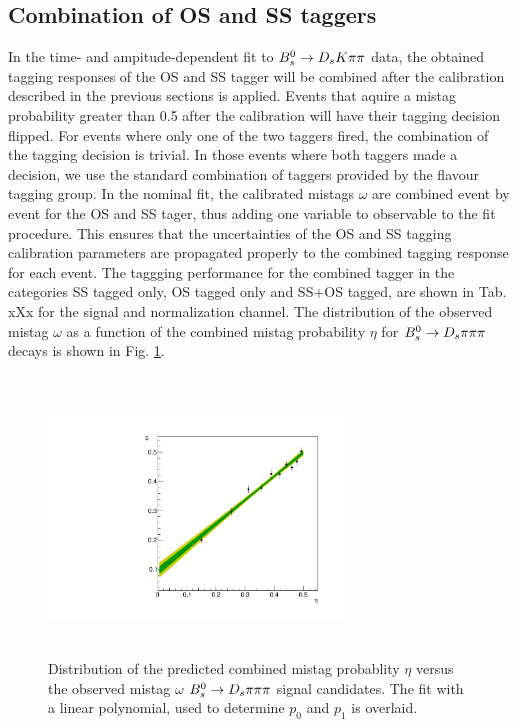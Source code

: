 \subsection{Combination of OS and SS taggers}
\label{subsec: TaggingCombination}

In the time- and ampitude-dependent fit to ${{B}^0_{s}}\rightarrow{\ensuremath{{D}_{s}}}{\ensuremath{K}}{\ensuremath{\pi}}{\ensuremath{\pi}}$ data, the obtained tagging responses of the OS and SS tagger will be combined after the calibration described in the previous sections is applied.
Events that aquire a mistag probability greater than 0.5 after the calibration will have their tagging decision flipped. For events where only one of the two taggers fired, the combination of the tagging decision is trivial.
In those events where both taggers made a decision, we use the standard combination of taggers \cite{LHCb-PAPER-2011-027} provided by the flavour tagging group. 
In the nominal fit, the calibrated mistags $\omega$ are combined event by event for the OS and SS tager, thus adding one variable to observable to the fit procedure. 
This ensures that the uncertainties of the OS and SS tagging calibration parameters are propagated properly to the combined tagging response for each event. \newline
The taggging performance for the combined tagger in the categories SS tagged only, OS tagged only and SS+OS tagged, are shown in Tab. xXx for the signal and normalization channel.
The distribution of the observed mistag $\omega$ as a function of the combined mistag probability $\eta$ for ${{B}^0_{s}}\rightarrow{\ensuremath{{D}_{s}}}{\ensuremath{\pi}}{\ensuremath{\pi}}{\ensuremath{\pi}}$ decays is shown in Fig. \ref{fig:TaggingCombinationCalibration}.


\begin{figure}[h]
\centering
\includegraphics[height=7.4cm,width=0.7\textwidth]{figs/Tagging/TaggingCombinationCalibration.pdf}
\caption{Distribution of the predicted combined mistag probablity $\eta$ versus the observed mistag $\omega$ ${{B}^0_{s}}\rightarrow{\ensuremath{{D}_{s}}}{\ensuremath{\pi}}{\ensuremath{\pi}}{\ensuremath{\pi}}$ signal candidates. 
The fit with a linear polynomial, used to determine $p_{0}$ and $p_{1}$ is overlaid.}
\label{fig:TaggingCombinationCalibration}
\end{figure}
